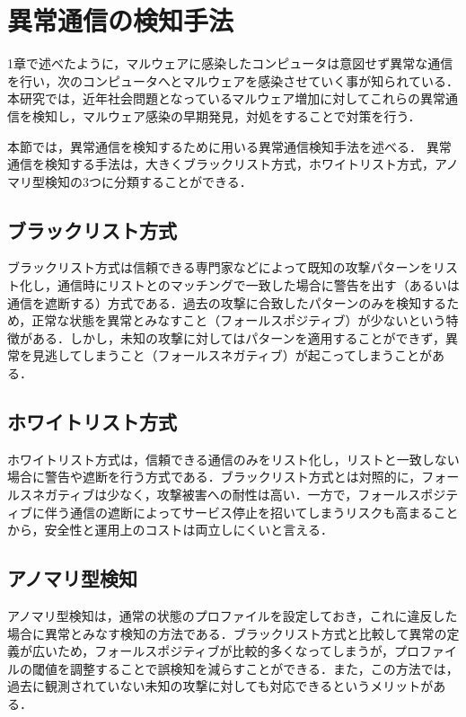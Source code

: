 \documentclass{thesis}
\begin{document}
\section{異常通信の検知手法}

1章で述べたように，マルウェアに感染したコンピュータは意図せず異常な通信を行い，次のコンピュータへとマルウェアを感染させていく事が知られている．本研究では，近年社会問題となっているマルウェア増加に対してこれらの異常通信を検知し，マルウェア感染の早期発見，対処をすることで対策を行う．

本節では，異常通信を検知するために用いる異常通信検知手法を述べる．
異常通信を検知する手法は，大きくブラックリスト方式，ホワイトリスト方式，アノマリ型検知の3つに分類することができる\cite{white}．

\subsection*{ブラックリスト方式}

ブラックリスト方式は信頼できる専門家などによって既知の攻撃パターンをリスト化し，通信時にリストとのマッチングで一致した場合に警告を出す（あるいは通信を遮断する）方式である．過去の攻撃に合致したパターンのみを検知するため，正常な状態を異常とみなすこと（フォールスポジティブ）が少ないという特徴がある．しかし，未知の攻撃に対してはパターンを適用することができず，異常を見逃してしまうこと（フォールスネガティブ）が起こってしまうことがある．

\subsection*{ホワイトリスト方式}

ホワイトリスト方式は，信頼できる通信のみをリスト化し，リストと一致しない場合に警告や遮断を行う方式である．ブラックリスト方式とは対照的に，フォールスネガティブは少なく，攻撃被害への耐性は高い．一方で，フォールスポジティブに伴う通信の遮断によってサービス停止を招いてしまうリスクも高まることから，安全性と運用上のコストは両立しにくいと言える．

\subsection*{アノマリ型検知}

アノマリ型検知は，通常の状態のプロファイルを設定しておき，これに違反した場合に異常とみなす検知の方法である．ブラックリスト方式と比較して異常の定義が広いため，フォールスポジティブが比較的多くなってしまうが，プロファイルの閾値を調整することで誤検知を減らすことができる．また，この方法では，過去に観測されていない未知の攻撃に対しても対応できるというメリットがある．
\end{document}
